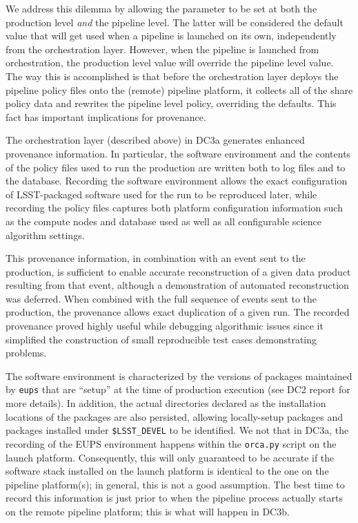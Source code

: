 We address this dilemma by allowing the parameter to be set at both
the production level {\it and} the pipeline level.  The latter will be
considered the default value that will get used when a pipeline is
launched on its own, independently from the orchestration layer.
However, when the pipeline is launched from orchestration, the
production level value will override the pipeline level value.  The
way this is accomplished is that before the orchestration layer
deploys the pipeline policy files onto the (remote) pipeline platform,
it collects all of the share policy data and rewrites the pipeline
level policy, overriding the defaults.  This fact has important
implications for provenance.  



The orchestration layer (described above) in DC3a generates enhanced
provenance information.  In particular, the software environment and
the contents of the policy files used to run the production are
written both to log files and to the database.  Recording the software
environment allows the exact configuration of LSST-packaged software
used for the run to be reproduced later, while recording the policy
files captures both platform configuration information such as the
compute nodes and database used as well as all configurable science
algorithm settings.

This provenance information, in combination with an event sent to the
production, is sufficient to enable accurate reconstruction of a given
data product resulting from that event, although a demonstration of
automated reconstruction was deferred.  When combined with the full
sequence of events sent to the production, the provenance allows exact
duplication of a given run.  The recorded provenance proved highly
useful while debugging algorithmic issues since it simplified the
construction of small reproducible test cases demonstrating problems.

The software environment is characterized by the versions of packages
maintained by {\tt eups} that are ``setup'' at the time of production
execution (see DC2 report for more details).  In addition, the actual
directories declared as the installation locations of the packages are
also persisted, allowing locally-setup packages and packages installed
under {\tt \$LSST\_DEVEL} to be identified.  We not that in DC3a, the
recording of the EUPS environment happens within the {\tt orca.py}
script on the launch platform.  Consequently, this will only
guaranteed to be accurate if the software stack installed on the
launch platform is identical to the one on the pipeline platform(s);
in general, this is not a good assumption.  The best time to record
this information is just prior to when the pipeline process actually
starts on the remote pipeline platform; this is what will happen in
DC3b.  

